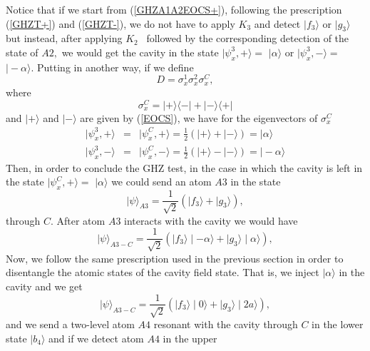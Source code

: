 \documentclass[12pt,thmsa]{article}
\begin{document}
Notice that if we start from (\ref{GHZA1A2EOCS+}), following the
prescription (\ref{GHZT+}) and (\ref{GHZT-}), we do not have to apply $K_{3}$
and detect $\mid f_{3}\rangle $ or $\mid g_{3}\rangle $ but instead, after
applying $K_{2}$ \ followed by the corresponding detection of the state of $%
A2,$ we would get the cavity in the state $|\psi _{x}^{3},+\rangle =$ $\mid
\alpha \rangle $ or $|\psi _{x}^{3},-\rangle =$ $\mid -\alpha \rangle $.
Putting in another way, if we define%
\begin{equation}
D=\sigma _{x}^{1}\sigma _{x}^{2}\sigma _{x}^{C},
\end{equation}%
where%
\begin{equation}
\sigma _{x}^{C}=|+\rangle \langle -|+|-\rangle \langle +|  \label{SigmaxC}
\end{equation}%
and $|+\rangle $ and $|-\rangle $ are given by (\ref{EOCS}), we have for the
eigenvectors of $\sigma _{x}^{C}$ 
\begin{eqnarray}
|\psi _{x}^{3},+\rangle &=&|\psi _{x}^{C},+\rangle =\frac{1}{2}(|+\rangle
+|-\rangle )=\mid \alpha \rangle  \nonumber \\
|\psi _{x}^{3},-\rangle &=&|\psi _{x}^{C},-\rangle =\frac{1}{2}(|+\rangle
-|-\rangle )=\mid -\alpha \rangle  \label{EVsigmaxC}
\end{eqnarray}%
Then, in order to conclude the GHZ test, in the case in which the cavity is
left in the state $|\psi _{x}^{C},+\rangle =$ $\mid \alpha \rangle $ we
could send an atom $A3$ in the state 
\begin{equation}
\mid \psi \rangle _{A3}=\frac{1}{\sqrt{2}}(\mid f_{3}\rangle +\mid
g_{3}\rangle ),
\end{equation}%
through $C$. After atom $A3$ interacts with the cavity we would have%
\begin{equation}
\mid \psi \rangle _{A3-C}=\frac{1}{\sqrt{2}}(\mid f_{3}\rangle \mid -\alpha
\rangle +\mid g_{3}\rangle \mid \alpha \rangle ),
\end{equation}%
Now, we follow the same prescription used in the previous section in order
to disentangle the atomic states of the cavity field state. That is, we
inject $\mid \alpha \rangle $ in the cavity and we get 
\begin{equation}
\mid \psi \rangle _{A3-C}=\frac{1}{\sqrt{2}}(\mid f_{3}\rangle \mid 0\rangle
+\mid g_{3}\rangle \mid 2a\rangle ),
\end{equation}%
and we send a two-level atom $A4$ resonant with the cavity through $C$ in
the lower state $|b_{4}\rangle $ and if we detect atom $A4$ in the upper
\end{document}
